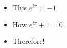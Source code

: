     \begin{itemize}
    \item This $e^{i\pi} = -1$
    \item How \(e^{i\pi} + 1 = 0\)
    \item Therefore!
    \end{itemize}
